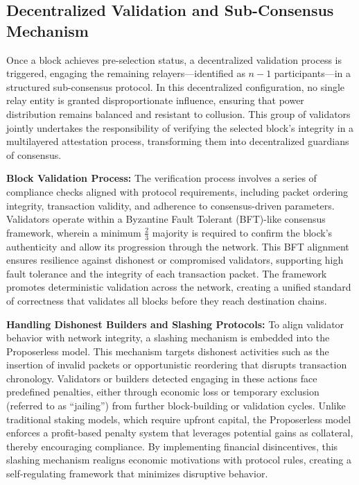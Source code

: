 \documentclass{article}
\begin{document}
\subsection*{Decentralized Validation and Sub-Consensus Mechanism}

Once a block achieves pre-selection status, a decentralized validation process is triggered, engaging the remaining relayers—identified as $n-1$ participants—in a structured sub-consensus protocol. In this decentralized configuration, no single relay entity is granted disproportionate influence, ensuring that power distribution remains balanced and resistant to collusion. This group of validators jointly undertakes the responsibility of verifying the selected block’s integrity in a multilayered attestation process, transforming them into decentralized guardians of consensus.

\textbf{Block Validation Process:} The verification process involves a series of compliance checks aligned with protocol requirements, including packet ordering integrity, transaction validity, and adherence to consensus-driven parameters. Validators operate within a Byzantine Fault Tolerant (BFT)-like consensus framework, wherein a minimum $\frac{2}{3}$ majority is required to confirm the block’s authenticity and allow its progression through the network. This BFT alignment ensures resilience against dishonest or compromised validators, supporting high fault tolerance and the integrity of each transaction packet. The framework promotes deterministic validation across the network, creating a unified standard of correctness that validates all blocks before they reach destination chains.

\textbf{Handling Dishonest Builders and Slashing Protocols:} To align validator behavior with network integrity, a slashing mechanism is embedded into the Proposerless model. This mechanism targets dishonest activities such as the insertion of invalid packets or opportunistic reordering that disrupts transaction chronology. Validators or builders detected engaging in these actions face predefined penalties, either through economic loss or temporary exclusion (referred to as “jailing”) from further block-building or validation cycles. Unlike traditional staking models, which require upfront capital, the Proposerless model enforces a profit-based penalty system that leverages potential gains as collateral, thereby encouraging compliance. By implementing financial disincentives, this slashing mechanism realigns economic motivations with protocol rules, creating a self-regulating framework that minimizes disruptive behavior.
\end{document}

